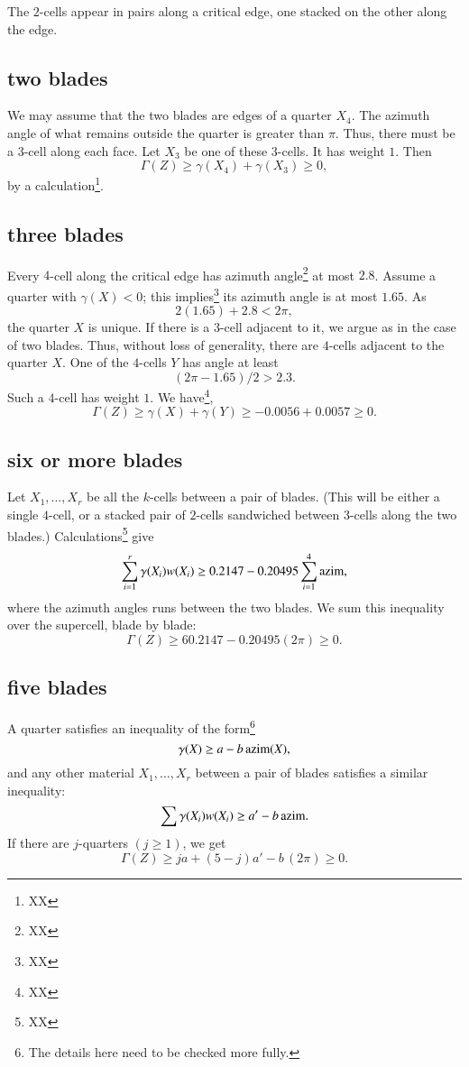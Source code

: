 The $2$-cells appear in pairs along a critical edge,
one stacked on the other along the edge.

\subsection{two blades}

We may assume that the two blades are edges of a quarter
$X_4$. 
The azimuth angle of what remains outside the quarter
is greater than $\pi$.  Thus, there must be a $3$-cell
along each face.  Let $X_3$ be one of these $3$-cells.
It has weight $1$.
Then $$\Gamma(Z)\ge \gamma(X_4)+\gamma(X_3)\ge 0,$$
by a calculation\footnote{XX}.

\subsection{three blades}

Every $4$-cell along the critical edge has azimuth
angle\footnote{XX} at most $2.8$.  Assume a quarter with $\gamma(X) <0$;
this implies\footnote{XX} 
its azimuth angle is at most $1.65$.
As
$$
2 (1.65) + 2.8 < 2 \pi,
$$
the quarter $X$ is unique.  If there is a $3$-cell adjacent
to it, we argue as in the case of two blades.  Thus, without loss of generality, there are $4$-cells adjacent to the quarter $X$.  One of the $4$-cells $Y$ has angle at least
$$
(2\pi - 1.65)/2 > 2.3.
$$
Such a $4$-cell has weight $1$.
We have\footnote{XX},
$$
\Gamma(Z)\ge \gamma(X) + \gamma(Y) \ge -0.0056 + 0.0057 \ge0.
$$

\subsection{six or more blades}

Let $X_1,\ldots,X_r$ be all the $k$-cells between a pair of
blades.  (This will be either a single $4$-cell, or a stacked pair of $2$-cells sandwiched between $3$-cells along
the two blades.)  Calculations\footnote{XX} give
$$\sum_{i=1}^r \gamma(X_i) w(X_i) \ge 0.2147 - 0.20495\sum_{i=1}^4 {\operatorname{azim}},$$
where the azimuth angles runs between the two blades.
We sum this inequality over the supercell, blade by blade:
$$
\Gamma(Z) \ge 6 0.2147 - 0.20495 (2\pi) \ge 0.
$$


\subsection{five blades}


A quarter satisfies an inequality of the form\footnote{The details here need to be checked more fully.}
$$
\gamma(X) \ge a - b\, {\operatorname{azim}}(X),
$$
and any other material $X_1,\ldots,X_r$
between a pair of blades
satisfies a similar inequality:
$$
\sum \gamma(X_i)w(X_i) \ge a' - b\,{\operatorname{azim}}.
$$
If there are $j$-quarters $(j\ge1)$, we get
$$
\Gamma(Z) \ge j a + (5-j) a' - b\, (2\pi) \ge 0.
$$

